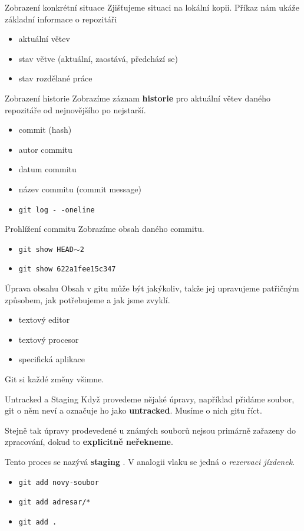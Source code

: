 \documentclass[14pt]{beamer}
\renewcommand{\texttt}[1]{{{\tt\color{blue}#1}}}
\begin{document}
	\begin{frame}{Zobrazení konkrétní situace}
	Zjišťujeme situaci na lokální kopii. Příkaz nám ukáže základní informace o repozitáři
	\begin{itemize}
		\item aktuální větev
		\item stav větve (aktuální, zaostává, předchází se)
		\item stav rozdělané práce
	\end{itemize}
	\end{frame}

	\begin{frame}{Zobrazení historie}
	Zobrazíme záznam \textbf{historie} pro aktuální větev daného repozitáře od nejnovějšího po nejstarší.
	\begin{itemize}
		\item commit (hash)
		\item autor commitu
		\item datum commitu
		\item název commitu (commit message)
		\item \texttt{git log -\,-oneline}
	\end{itemize}
	\end{frame}


	\begin{frame}{Prohlížení commitu}
	Zobrazíme obsah daného commitu.
	\begin{itemize}
		\item \texttt{git show HEAD$ \sim $2}
		\item \texttt{git show 622a1fee15c347}
	\end{itemize}
	\end{frame}

	\begin{frame}{Úprava obsahu}
		Obsah v gitu může být jakýkoliv, takže jej upravujeme patřičným způsobem, jak potřebujeme a jak jsme zvyklí.
			\begin{itemize}
			\item textový editor
			\item textový procesor
			\item specifická aplikace
		\end{itemize}
		Git si každé změny všimne.
	\end{frame}

	\begin{frame}{Untracked a Staging}
	Když provedeme nějaké úpravy, například přidáme soubor, git o něm neví a označuje ho jako \textbf{untracked}. Musíme o nich gitu říct. 
	
	Stejně tak úpravy prodevedené u známých souborů nejsou primárně zařazeny do zpracování, dokud to \textbf{explicitně neřekneme}. 
	
	Tento proces se nazývá \textbf{staging }. V analogii vlaku se jedná o \textit{rezervaci jízdenek}.
		\begin{itemize}
			\item \texttt{git add novy-soubor}
			\item \texttt{git add adresar/*}
			\item \texttt{git add .}
		\end{itemize}
	\end{frame}
\end{document}
